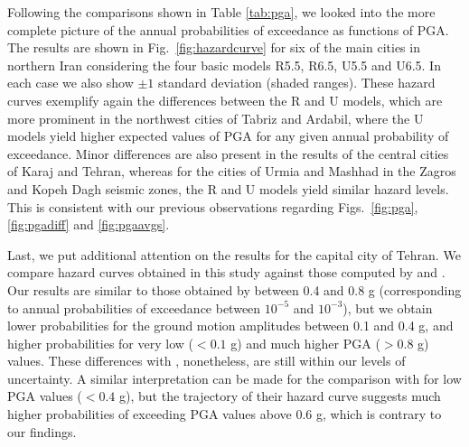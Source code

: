 Following the comparisons shown in Table \ref{tab:pga}, we looked into the more complete picture of the annual probabilities of exceedance as functions of PGA. The results are shown in Fig.~\ref{fig:hazardcurve} for six of the main cities in northern Iran considering the four basic models R5.5, R6.5, U5.5 and U6.5. In each case we also show $\pm 1$ standard deviation (shaded ranges). These hazard curves exemplify again the differences between the R and U models, which are more prominent in the northwest cities of Tabriz and Ardabil, where the U models yield higher expected values of PGA for any given annual probability of exceedance. Minor differences are also present in the results of the central cities of Karaj and Tehran, whereas for the cities of Urmia and Mashhad in the Zagros and Kopeh Dagh seismic zones, the R and U models yield similar hazard levels. This is consistent with our previous observations regarding Figs.~\ref{fig:pga}, \ref{fig:pgadiff} and \ref{fig:pgaavgs}.

Last, we put additional attention on the results for the capital city of Tehran. We compare hazard curves obtained in this study against those computed by \citet{Ghodrati2003} and \citet{Boostan2015}. Our results are similar to those obtained by \citet{Ghodrati2003} between 0.4 and 0.8 g (corresponding to annual probabilities of exceedance between $10^{-5}$ and $10^{-3}$), but we obtain lower probabilities for the ground motion amplitudes between 0.1 and 0.4 g, and higher probabilities for very low ($<0.1$ g) and much higher PGA ($>0.8$ g) values. These differences with \citet{Ghodrati2003}, nonetheless, are still within our levels of uncertainty. A similar interpretation can be made for the comparison with \citet{Boostan2015} for low PGA values ($<0.4$ g), but the trajectory of their hazard curve suggests much higher probabilities of exceeding PGA values above 0.6 g, which is contrary to our findings.






